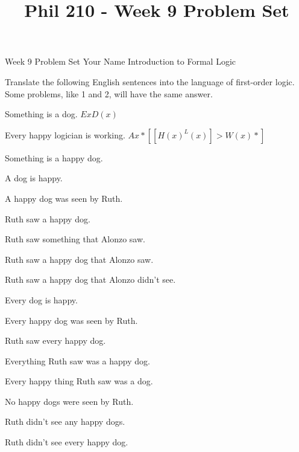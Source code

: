 
\title{Phil 210 - Week 9 Problem Set}

\heading
Week 9 Problem Set
Your Name
Introduction to Formal Logic
\endheading

Translate the following English sentences into the language of first-order logic. Some problems, like 1 and 2, will have the same answer.

\quantifiers
\problems
{}
Something is a dog.
        \answer 
        $ Ex D(x) $
        \endanswer\Bigskip

Every happy logician is working.
        \answer 
        $ Ax*[[H(x) ^ L(x)] > W(x)*] $
        \endanswer

Something is a happy dog.
        \answer
        $ $
        \endanswer

A dog is happy.
        \answer
        $ $
        \endanswer

A happy dog was seen by Ruth.
        \answer
        $ $
        \endanswer

Ruth saw a happy dog.
        \answer
        $ $
        \endanswer

Ruth saw something that Alonzo saw.
        \answer
        $ $
        \endanswer

Ruth saw a happy dog that Alonzo saw.
        \answer
        $ $
        \endanswer

Ruth saw a happy dog that Alonzo didn't see.
        \answer
        $ $
        \endanswer

Every dog is happy.
        \answer
        $ $
        \endanswer

Every happy dog was seen by Ruth.
        \answer
        $ $
        \endanswer

Ruth saw every happy dog.
        \answer
        $ $
        \endanswer

Everything Ruth saw was a happy dog.
        \answer
        $ $
        \endanswer

Every happy thing Ruth saw was a dog.
        \answer
        $ $
        \endanswer

No happy dogs were seen by Ruth.
        \answer
        $ $
        \endanswer

Ruth didn't see any happy dogs.
        \answer
        $ $
        \endanswer

Ruth didn't see every happy dog.
        \answer
        $ $
        \endanswer

